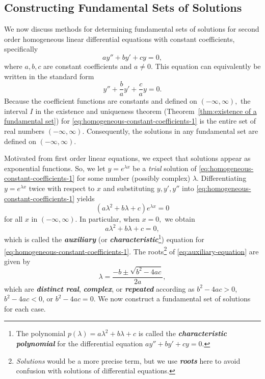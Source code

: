 \subsection{Constructing Fundamental Sets of Solutions}
	 We now discuss methods for determining fundamental sets of solutions for  second order  homogeneous linear differential equations with constant coefficients, specifically
	\begin{equation}\label{eq:homogeneous-constant-coefficients-1}
	ay''+by'+cy =0,
	\end{equation}
	where $a, b, c$ are constant coefficients and $a\ne 0.$ This equation can equivalently be written in the standard form 
		\begin{equation}\label{eq:homogeneous-constant-coefficients-2}
		y''+\frac{b}{a}y'+\frac{c}{a}y =0.
	\end{equation}	
Because the  coefficient functions are constants and defined on $(-\infty, \infty),$ the interval $I$ in the existence and uniqueness theorem (Theorem~\ref{thm:existence of a fundamental set}) for \eqref{eq:homogeneous-constant-coefficients-1} is the entire set of real numbers $(-\infty, \infty).$ Consequently, the solutions in any fundamental set are defined on $(-\infty, \infty).$
	 	
Motivated from first order linear equations, we expect that solutions appear as exponential functions. So, we let $y = e^{\lambda x}$ be a \textit{trial} solution of \eqref{eq:homogeneous-constant-coefficients-1} for some number (possibly complex) $\lambda.$  Differentiating $y = e^{\lambda x}$  twice with respect to $x$  and substituting  $y, y',y''$ into \eqref{eq:homogeneous-constant-coefficients-1} yields
\[
	(a\lambda^2+ b\lambda +c)e^{\lambda x} = 0
\]
for all $x$ in $(-\infty, \infty).$ In particular, when $x=0,$ we obtain
\begin{equation}\label{eq:auxiliary-equation}
	a\lambda^2+ b\lambda +c =0,
\end{equation}
which is called the \textbf{\textit{auxiliary}} (or \textbf{\textit{characteristic}}\footnote[1]{The polynomial \(p(\lambda) = a\lambda^2+b\lambda+c\) is called the \textbf{\textit{characteristic polynomial}} for the differential equation \(ay''+by'+cy=0\).}) equation for \eqref{eq:homogeneous-constant-coefficients-1}.
The roots\footnote[2]{\textit{Solutions} would be a more precise term, but we use \textit{\textbf{roots}} here to avoid confusion with solutions of differential equations.} of \eqref{eq:auxiliary-equation} are given by 
\begin{equation}\label{eq:auxiliary-equation-solutions}
	\lambda=\frac{-b\pm\sqrt{b^2-4ac}}{2a},
\end{equation}
which are  \textbf{\textit{distinct real}}, \textbf{\textit{complex}}, or \textbf{\textit{repeated}}  according as \(b^2-4ac>0\), \(b^2-4ac<0\), or \(b^2-4ac=0\). We now construct a fundamental set of solutions for each case.

